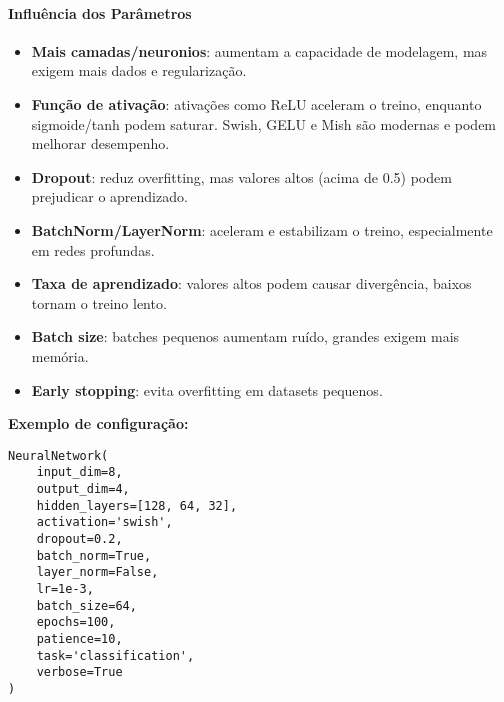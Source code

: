 \documentclass[11pt]{article}
\begin{document}
\paragraph{Influência dos Parâmetros}
\begin{itemize}
    \item \textbf{Mais camadas/neuronios}: aumentam a capacidade de modelagem, mas exigem mais dados e regularização.
    \item \textbf{Função de ativação}: ativações como ReLU aceleram o treino, enquanto sigmoide/tanh podem saturar. Swish, GELU e Mish são modernas e podem melhorar desempenho.
    \item \textbf{Dropout}: reduz overfitting, mas valores altos (acima de 0.5) podem prejudicar o aprendizado.
    \item \textbf{BatchNorm/LayerNorm}: aceleram e estabilizam o treino, especialmente em redes profundas.
    \item \textbf{Taxa de aprendizado}: valores altos podem causar divergência, baixos tornam o treino lento.
    \item \textbf{Batch size}: batches pequenos aumentam ruído, grandes exigem mais memória.
    \item \textbf{Early stopping}: evita overfitting em datasets pequenos.
\end{itemize}

\textbf{Exemplo de configuração:}
\begin{verbatim}
NeuralNetwork(
    input_dim=8,
    output_dim=4,
    hidden_layers=[128, 64, 32],
    activation='swish',
    dropout=0.2,
    batch_norm=True,
    layer_norm=False,
    lr=1e-3,
    batch_size=64,
    epochs=100,
    patience=10,
    task='classification',
    verbose=True
)
\end{verbatim}
\end{document}
